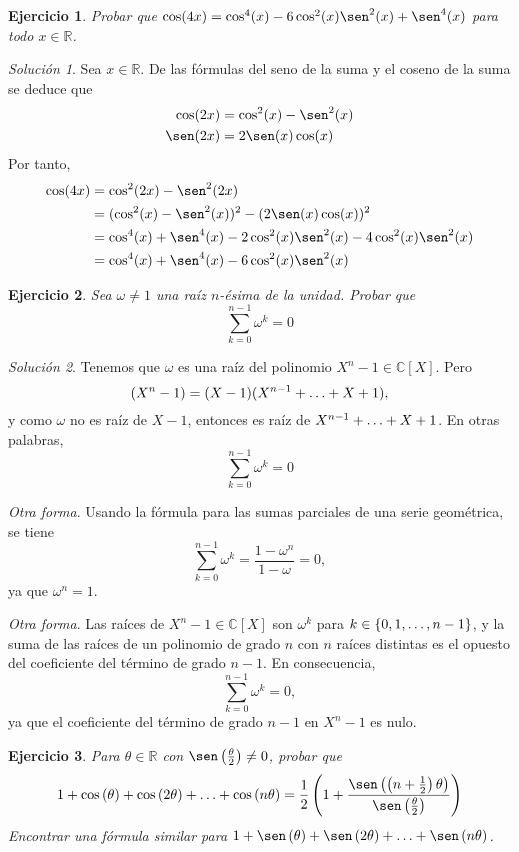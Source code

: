\documentclass[11pt]{report}
\newcommand{\R}{\mathbb R}
\newcommand{\C}{\mathbb C}
\newcommand{\pars}[1]{\left( #1 \right)} %
\newtheorem{exercise}{Ejercicio}
\theoremstyle{remark}
\newtheorem*{resolution}{Solución}
\begin{document}
\begin{exercise}
    Probar que $\cos(4x)=\cos^4(x)-6\cos^2(x)\sen^2(x)+\sen^4(x)$ para todo $x \in \R$.
\end{exercise}

\begin{resolution}
    Sea $x \in \R$. De las fórmulas del seno de la suma y el coseno de la suma se deduce que
    \[\begin{aligned}[t]
        \cos(2x) &= \cos^2(x)-\sen^2(x) \\
        \sen(2x) &= 2\sen(x)\cos(x)
    \end{aligned}\]
    Por tanto,
    \[\begin{aligned}[t]
    \cos(4x) &= \cos^2(2x)-\sen^2(2x) \\
    &= (\cos^2(x)-\sen^2(x))^2-(2\sen(x)\cos(x))^2 \\
    &= \cos^4(x)+\sen^4(x)-2\cos^2(x)\sen^2(x)-4\cos^2(x)\sen^2(x) \\
    &= \cos^4(x)+\sen^4(x)-6\cos^2(x)\sen^2(x)
    \end{aligned}
    \]
\end{resolution}


\begin{exercise}
    Sea $\omega \neq 1$ una raíz $n$-ésima de la unidad. Probar que
    \[\sum_{k=0}^{n-1} \omega^k = 0\]
\end{exercise}

\begin{resolution}
    Tenemos que $\omega$ es una raíz del polinomio $X^n-1 \in \C[X]$. Pero
    \[(X^n-1)=(X-1)(X^{n-1}+\mathellipsis+X+1),\]
    y como $\omega$ no es raíz de $X-1$, entonces es raíz de $X^{n-1}+\mathellipsis+X+1$. En otras palabras,
    \[\sum_{k=0}^{n-1}\omega^k = 0\]

    \textit{Otra forma}. Usando la fórmula para las sumas parciales de una serie geométrica, se tiene
    \[\sum_{k=0}^{n-1}\omega^k = \frac{1-\omega^n}{1-\omega} = 0,\]
    ya que $\omega^n = 1$.

    \textit{Otra forma}. Las raíces de $X^n-1 \in \C[X]$ son $\omega^k$ para $k \in \{0,1,\mathellipsis,n-1\}$, y la suma de las raíces de un polinomio de grado $n$ con $n$ raíces distintas es el opuesto del coeficiente del término de grado $n-1$. En consecuencia,
    \[\sum_{k=0}^{n-1}\omega^k = 0,\]
    ya que el coeficiente del término de grado $n-1$ en $X^n-1$ es nulo.
\end{resolution}

\begin{exercise}
    Para $\theta \in \R$ con $\sen\pars{\frac{\theta}{2}} \neq 0$, probar que
    \[1+\cos\pars{\theta}+\cos\pars{2\theta}+\mathellipsis+\cos\pars{n\theta} = \frac{1}{2}\pars{1+\frac{\sen\pars{\pars{{n+\frac{1}{2}}}\theta}}{\sen\pars{\frac{\theta}{2}}}}\]
    Encontrar una fórmula similar para $1+\sen\pars{\theta}+\sen\pars{2\theta}+\mathellipsis+\sen\pars{n\theta}$.
\end{exercise}
\end{document}
